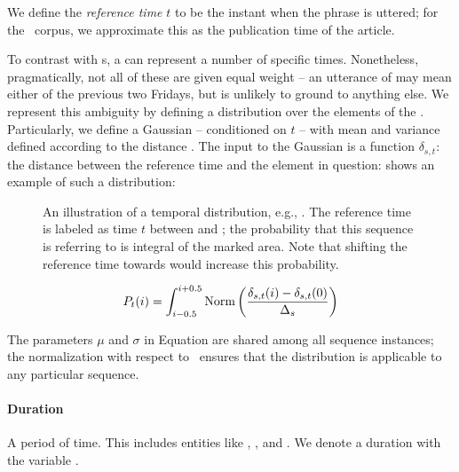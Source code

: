 We define the \textit{reference time} $t$ \cite{key:1947reichenback-temporal}
	to be the instant when the phrase 
	is uttered; for the \tempeval\ corpus, we approximate this as the
	publication time of the article.

To contrast with s, a  can represent a number of specific
	times.
Nonetheless, pragmatically, not all of these are given equal weight --
	an utterance of  may mean either of the previous two Fridays,
	but is unlikely to ground to anything else.
We represent this ambiguity by defining a distribution over the elements
	of the .
Particularly, we define a Gaussian -- conditioned on $t$ -- with mean and
	variance defined according to the distance \seqjump.
The input to the Gaussian is a function $\delta_{s,t}$:
	the distance between the reference time and the element in question:
 shows an example of such a distribution:
\begin{figure}[t]
\begin{center}
	\resizebox{1.1\hsize}{!}{
		
	}
	\caption{
		\label{fig:distribution}
		An illustration of a temporal distribution, e.g., .
		The reference time is labeled as time $t$ between  and 
			; the probability that this sequence is referring to
			 is integral of the marked area.
		Note that shifting the reference time towards  would increase
			this probability.
	}
\end{center}
\end{figure}
\begin{equation}
\label{eqn:gaussian}
	P_t(i) = 
	\int_{i-0.5}^{i+0.5}
		\textrm{Norm}\left(\frac{\delta_{s,t}(i)-\delta_{s,t}(0)}{\Delta_s}\right)
\end{equation}

The parameters $\mu$ and $\sigma$ in Equation  are shared
	among all sequence instances; the normalization
	with respect to \seqjump\ ensures that the distribution is applicable
	to any particular sequence.
	
\paragraph{Duration}
A period of time.
This includes entities like , , and .
We denote a duration with the variable \dur.

